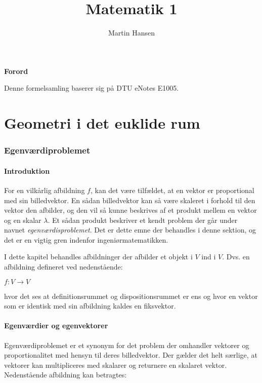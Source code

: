 \documentclass{article}
\author{Martin Hansen}
\title{Matematik 1}
\newcommand{\cent}[1]{\begin{center}#1\end{center}}
\begin{document}
	
	\maketitle
	\begin{center}
		\Large \textbf{Forord}
		
		Denne formelsamling baserer sig på DTU eNotes E1005.
	\end{center}
	\pagebreak
	\tableofcontents
	\pagebreak
	\part{\textbf{Geometri i det euklide rum}}
	
	\section{Egenværdiproblemet}
	
	\subsection*{Introduktion}
	
	For en vilkårlig afbildning $f$, kan det være tilfældet, at en vektor er proportional med sin billedvektor. En sådan billedvektor kan så være skaleret i forhold til den vektor den afbilder, og den vil så kunne beskrives af et produkt mellem en vektor og en skalar $\lambda$. Et sådan produkt beskriver et kendt problem der går under navnet \textit{egenværdisproblemet}. Det er dette emne der behandles i denne sektion, og det er en vigtig gren indenfor ingeniørmatematikken. \newline
	
	I dette kapitel behandles afbildninger der afbilder et objekt i $V$ ind i $V$. Dvs. en afbildning defineret ved nedenstående:
	
	\cent{$ f:V \rightarrow V $}
	
	hvor det ses at definitionsrummet og dispositionsrummet er ens og hvor en vektor som er identisk med sin afbildning kaldes en fiksvektor. 
	
	\subsection{Egenværdier og egenvektorer}
	
	Egenværdiproblemet er et synonym for det problem der omhandler vektorer og proportionalitet med hensyn til deres billedvektor. Der gælder det helt særlige, at vektorer kan multipliceres med skalarer og returnere en skalaret vektor. Nedenstående afbildning kan betragtes:
	
\end{document}
